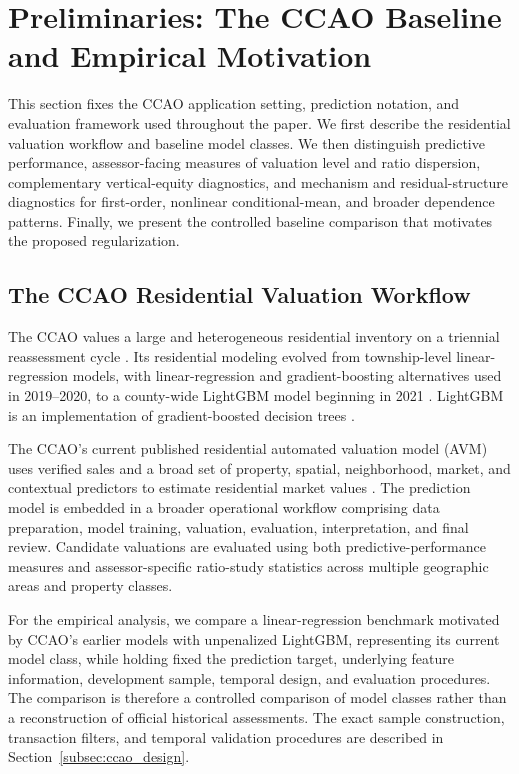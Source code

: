\documentclass[10pt]{article}
\theoremstyle{definition}
\newcommand{\1}{\mathbf{1}}
\begin{document}
\section{Preliminaries: The CCAO Baseline and Empirical Motivation}
\label{sec:setting}


This section fixes the CCAO application setting, prediction notation, and evaluation framework used throughout the paper. We first describe the residential valuation workflow and baseline model classes. We then distinguish predictive performance, assessor-facing measures of valuation level and ratio dispersion, complementary vertical-equity diagnostics, and mechanism and residual-structure diagnostics for first-order, nonlinear conditional-mean, and broader dependence patterns. Finally, we present the controlled baseline comparison that motivates the proposed regularization.


\subsection{The CCAO Residential Valuation Workflow}
\label{subsec:ccao_workflow}

The CCAO values a large and heterogeneous residential inventory on a triennial reassessment cycle \cite{CCAOAssessmentCalendar2026}. Its residential modeling evolved from township-level linear-regression models, with linear-regression and gradient-boosting alternatives used in 2019--2020, to a county-wide LightGBM model beginning in 2021 \cite{CCAOModelResAVM2026}. LightGBM is an implementation of gradient-boosted decision trees \cite{lightgbm}.

The CCAO's current published residential automated valuation model (AVM) uses verified sales and a broad set of property, spatial, neighborhood, market, and contextual predictors to estimate residential market values \cite{CCAOModelResAVM2026}. The prediction model is embedded in a broader operational workflow comprising data preparation, model training, valuation, evaluation, interpretation, and final review. Candidate valuations are evaluated using both predictive-performance measures and assessor-specific ratio-study statistics across multiple geographic areas and property classes.


{For the empirical analysis, we compare a linear-regression benchmark motivated by CCAO's earlier models with unpenalized LightGBM, representing its current model class, while holding fixed the prediction target, underlying feature information, development sample, temporal design, and evaluation procedures.}
The comparison is therefore a controlled comparison of model classes rather than a reconstruction of official historical assessments. The exact sample construction, transaction filters, and temporal validation procedures are described in Section~\ref{subsec:ccao_design}.
\end{document}
